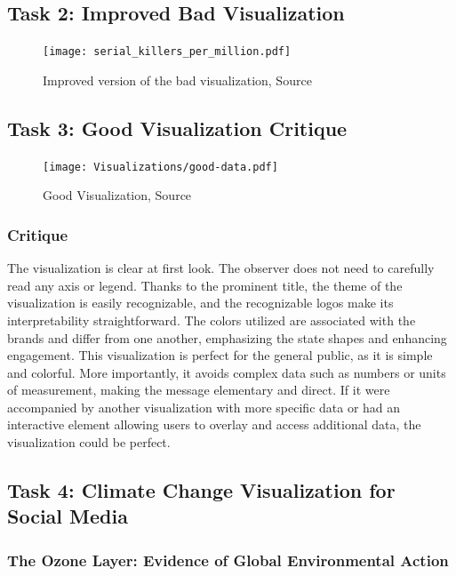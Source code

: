 \documentclass[a4paper,landscape]{article}
\begin{document}
\subsection{Task 2: Improved Bad Visualization}
\begin{figure}[H]
    \centering
    \texttt{[image: serial\_killers\_per\_million.pdf]} %
    \caption{Improved version of the bad visualization, Source\cite{worldatlas2025serialkillers}}
    \label{fig:improved}
\end{figure}

\subsection{Task 3: Good Visualization Critique}
\begin{figure}[H]
    \centering
    \texttt{[image: Visualizations/good-data.pdf]} %
    \caption{Good Visualization, Source \cite{reddit2025cyberbrands}}
    \label{fig:popBrand}
\end{figure}
\subsubsection{Critique}
The visualization is clear at first look. The observer does not need to carefully read any axis or legend. Thanks to the prominent title, the theme of the visualization is easily recognizable, and the recognizable logos make its interpretability straightforward. The colors utilized are associated with the brands and differ from one another, emphasizing the state shapes and enhancing engagement. This visualization is perfect for the general public, as it is simple and colorful. More importantly, it avoids complex data such as numbers or units of measurement, making the message elementary and direct. If it were accompanied by another visualization with more specific data or had an interactive element allowing users to overlay and access additional data, the visualization could be perfect.

\subsection{Task 4: Climate Change Visualization for Social Media}
\subsubsection{The Ozone Layer: Evidence of Global Environmental Action}
\end{document}
